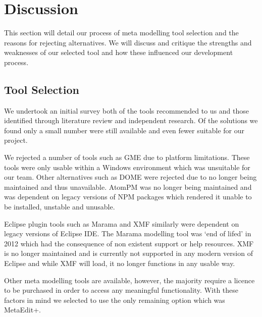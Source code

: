 \section{Discussion}
This section will detail our process of meta modelling tool selection and the reasons for rejecting alternatives. We will discuss and critique the strengths and weaknesses of our selected tool and how these influenced our development process.\par
\subsection{Tool Selection}
We undertook an initial survey both of the tools recommended to us and those identified through literature review and independent research. Of the solutions we found only a small number were still available and even fewer suitable for our project.\par
We rejected a number of tools such as GME due to platform limitations. These tools were only usable within a Windows environment which was unsuitable for our team. Other alternatives such as DOME were rejected due to no longer being maintained and thus unavailable. AtomPM was no longer being maintained and was dependent on legacy versions of NPM packages which rendered it unable to be installed, unstable and unusable.\par Eclipse plugin tools such as Marama and XMF similarly were dependent on legacy versions of Eclipse IDE. The Marama modelling tool was ‘end of lifed’ in 2012 which had the consequence of non existent support or help resources. XMF is no longer maintained and is currently not supported in any modern version of Eclipse and while XMF will load, it no longer functions in any usable way. \par
Other meta modelling tools are available, however, the majority require a licence to be purchased in order to access any meaningful functionality. With these factors in mind we selected to use the only remaining option which was MetaEdit+.

